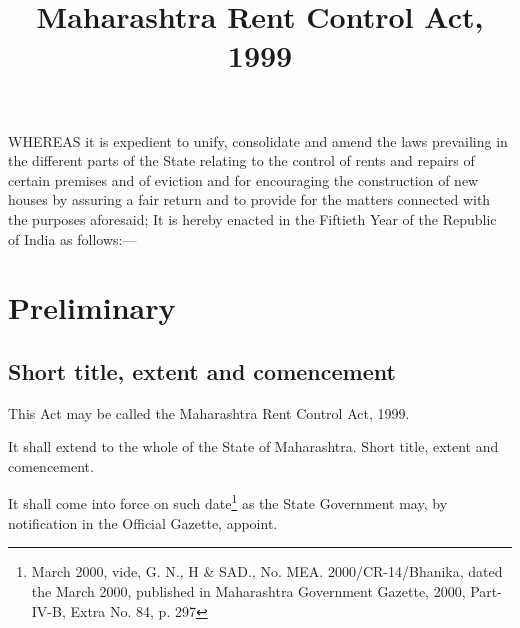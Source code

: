 \documentclass{mhact}
\begin{document}
 \layout
{}
\title{Maharashtra Rent Control Act, 1999}

\maketitle

\tableofcontents
{} 






WHEREAS it is expedient to unify, consolidate and amend the laws
prevailing in the different parts of the State relating to the control
of rents and repairs of certain premises and of eviction and for
encouraging the construction of new houses by assuring a fair return
and to provide for the matters connected with the purposes aforesaid;
It is hereby enacted in the Fiftieth Year of the Republic of India as
follows:---

\chapter{Preliminary}

\section{Short title, extent and comencement}

\begin{subsectionlist}
\item This Act may be called the Maharashtra Rent Control Act,
  1999.
\item It shall extend to the whole of the State of Maharashtra. Short title, extent and
comencement.
\item It shall come into force on such date\footnote{  March
    2000, vide, G. N., H \& SAD., No. MEA. 2000/CR-14/Bhanika, dated
    the  March 2000, published in Maharashtra Government
    Gazette, 2000, Part-IV-B, Extra No. 84, p. 297 } as the State
  Government may, by notification in the Official Gazette, appoint.
\end{subsectionlist}
\end{document}
